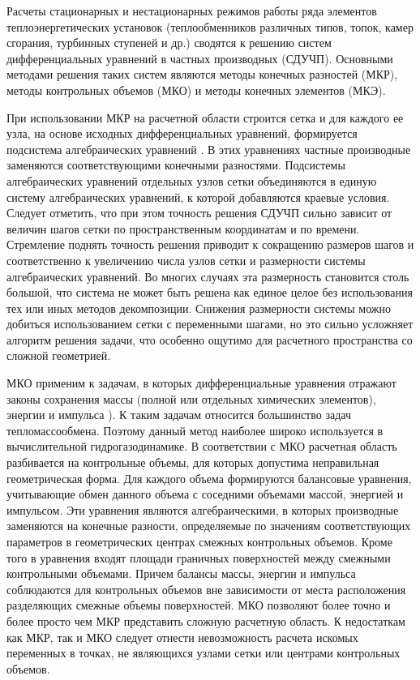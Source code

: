 \documentclass[a4paper,11pt,numreferences,mathsec,kaplist]{isuepsutf8}
\begin{document}
\begin{article}
Расчеты стационарных и нестационарных режимов работы ряда элементов
теплоэнергетических установок (теплообменников различных типов, топок,
камер сгорания, турбинных ступеней и др.) сводятся к решению систем
дифференциальных уравнений в частных производных (СДУЧП). Основными
методами решения таких систем являются методы конечных разностей (МКР),
методы контрольных объемов (МКО) и методы конечных элементов (МКЭ).  

При использовании МКР на расчетной области строится сетка и для
каждого ее узла, на основе исходных дифференциальных уравнений,
формируется подсистема алгебраических уравнений
\cite{SN1978,C2020,S1985,KD2018}. В этих уравнениях частные
производные заменяются соответствующими конечными разностями.
Подсистемы алгебраических уравнений отдельных узлов сетки объединяются
в единую систему алгебраических уравнений, к которой добавляются
краевые условия. Следует отметить, что при этом точность решения СДУЧП
сильно зависит от величин шагов сетки по пространственным координатам
и по времени. Стремление поднять точность решения приводит к
сокращению размеров шагов и соответственно к увеличению числа узлов
сетки и размерности системы алгебраических уравнений. Во многих
случаях эта размерность становится столь большой, что система не может
быть решена как единое целое без использования тех или иных методов
декомпозиции.  Снижения размерности системы можно добиться
использованием сетки с переменными шагами, но это сильно усложняет
алгоритм решения задачи, что особенно ощутимо для расчетного
пространства со сложной геометрией.

МКО применим к задачам, в которых дифференциальные уравнения отражают
законы сохранения массы (полной или отдельных химических элементов),
энергии и импульса \cite{C2020,KD2018,PS1968}). К таким задачам
относится большинство задач тепломассообмена.  Поэтому данный метод
наиболее широко используется в вычислительной гидрогазодинамике. В
соответствии с МКО расчетная область разбивается на контрольные
объемы, для которых допустима неправильная геометрическая форма.  Для
каждого объема формируются балансовые уравнения, учитывающие обмен
данного объема с соседними объемами массой, энергией и импульсом. Эти
уравнения являются алгебраическими, в которых производные заменяются
на конечные разности, определяемые по значениям соответствующих
параметров в геометрических центрах смежных контрольных объемов. Кроме
того в уравнения входят площади граничных поверхностей между смежными
контрольными объемами. Причем балансы массы, энергии и импульса
соблюдаются для контрольных объемов вне зависимости от места
расположения разделяющих смежные объемы поверхностей. МКО позволяют
более точно и более просто чем МКР представить сложную расчетную
область.  К недостаткам как МКР, так и МКО следует отнести
невозможность расчета искомых переменных в точках, не являющихся
узлами сетки или центрами контрольных объемов.


\end{article}
\end{document}
